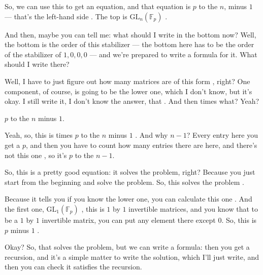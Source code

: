 \begin{speech}[01:18:02 - 01:18:59]
So, we can use this to get an equation, and that equation is $p$ to the $n$, minus $1$ --- that's the left-hand side . The top is $\mathrm{GL}_n(\mathbb{F}_p)$ .

And then, maybe you can tell me: what should I write in the bottom now? Well, the bottom is the order of this stabilizer --- the bottom here has to be the order of the stabilizer of $1, 0, 0, 0$  --- and we're prepared to write a formula for it. What should I write there?

Well, I have to just figure out how many matrices are of this form , right? One component, of course, is going to be the lower one, which I don't know, but it's okay. I still write it, I don't know the answer, that . And then times what? Yeah?
\end{speech}

\begin{student}
$p$ to the $n$ minus $1$.
\end{student}

\begin{speech}[01:19:01 - 01:19:57]
Yeah, so, this is times $p$ to the $n$ minus $1$ . And why $n - 1$? Every entry here  you get a $p$, and then you have to count how many entries there are here, and there's not this one , so it's $p$ to the $n - 1$.

So, this is a pretty good equation: it solves the problem, right? Because you just start from the beginning and solve the problem. So, this solves the problem .

Because it tells you if you know the lower one, you can calculate this one . And the first one, $\mathrm{GL}_1(\mathbb{F}_p)$ , this is $1$ by $1$ invertible matrices, and you know that to be a $1$ by $1$ invertible matrix, you can put any element there except $0$. So, this is $p$ minus $1$ .

Okay? So, that solves the problem, but we can write a formula: then you get a recursion, and it's a simple matter to write the solution, which I'll just write, and then you can check it satisfies the recursion.
\end{speech}

